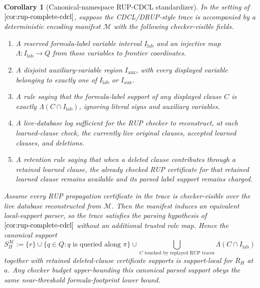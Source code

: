 \documentclass[11pt]{article}
\newtheorem{corollary}[theorem]{Corollary}
\theoremstyle{definition}
\begin{document}
\begin{corollary}[Canonical-namespace RUP-CDCL standardizer]\label{cor:canonical-namespace-rup-cdcl}
In the setting of \(\Cref{cor:rup-complete-cdcl}\), suppose the CDCL/DRUP-style trace is accompanied by a deterministic encoding manifest \(\mathcal M\) with the following checker-visible fields.
\begin{enumerate}[label=(\roman*)]
  \item A reserved formula-label variable interval \(I_{\mathrm{lab}}\) and an injective map \(\Lambda:I_{\mathrm{lab}}\to Q\) from those variables to frontier coordinates.
  \item A disjoint auxiliary-variable region \(I_{\mathrm{aux}}\), with every displayed variable belonging to exactly one of \(I_{\mathrm{lab}}\) or \(I_{\mathrm{aux}}\).
  \item A rule saying that the formula-label support of any displayed clause \(C\) is exactly \(\Lambda(C\cap I_{\mathrm{lab}})\), ignoring literal signs and auxiliary variables.
  \item A live-database log sufficient for the RUP checker to reconstruct, at each learned-clause check, the currently live original clauses, accepted learned clauses, and deletions.
  \item A retention rule saying that when a deleted clause contributes through a retained learned clause, the already checked RUP certificate for that retained learned clause remains available and its parsed label support remains charged.
\end{enumerate}
Assume every RUP propagation certificate in the trace is checker-visible over the live database reconstructed from \(\mathcal M\).  Then the manifest induces an equivalent local-support parser, so the trace satisfies the parsing hypothesis of \(\Cref{cor:rup-complete-cdcl}\) without an additional trusted role map.  Hence the canonical support
\[
  S_\Pi^{\mathcal M}
  :=
  \{r\}\cup\{q\in Q:q\text{ is queried along }\pi\}
  \cup
  \bigcup_{C\text{ touched by replayed RUP traces}}\Lambda(C\cap I_{\mathrm{lab}})
\]
together with retained deleted-clause certificate supports is support-local for \(R_H\) at \(a\).  Any checker budget upper-bounding this canonical parsed support obeys the same near-threshold formula-footprint lower bound.
\end{corollary}
\end{document}
